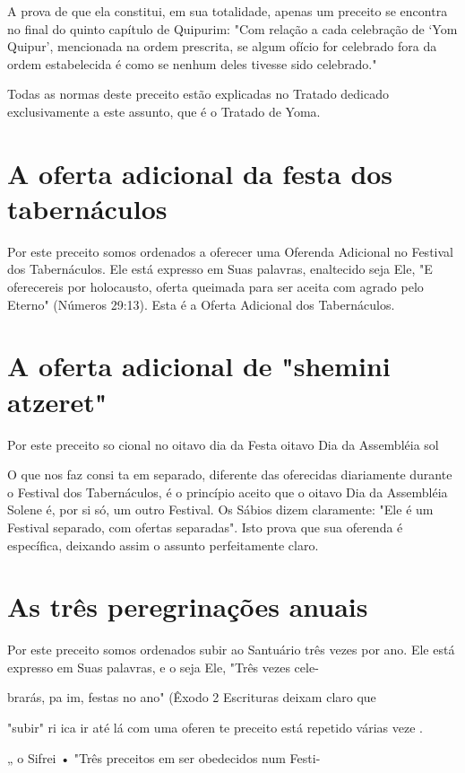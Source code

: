 \begin{itemize}
\begin{enumrate}
\begin{itemize}
\begin{itemize}
A prova de que ela constitui, em sua totalidade, apenas um preceito se
encontra no final do quinto capítulo de Quipurim: "Com relação a cada
ce­lebração de `Yom Quipur', mencionada na ordem prescrita, se algum
ofício for celebrado fora da ordem estabelecida é como se nenhum deles
tivesse sido ce­lebrado."

Todas as normas deste preceito estão explicadas no Tratado dedica­do
exclusivamente a este assunto, que é o Tratado de Yoma.

\section{A oferta adicional da festa dos tabernáculos}

Por este preceito somos ordenados a oferecer uma Oferenda Adi­cional no
Festival dos Tabernáculos. Ele está expresso em Suas palavras,
enal­tecido seja Ele, "E oferecereis por holocausto, oferta queimada
para ser aceita com agrado pelo Eterno" (Números 29:13). Esta é a Oferta
Adicional dos Ta­bernáculos.

\section{A oferta adicional de "shemini atzeret"}

Por este preceito so cional no oitavo dia da Festa oitavo Dia da
Assembléia sol

O que nos faz consi ta em separado, diferente das oferecidas diariamente
durante o Festival dos Ta­bernáculos, é o princípio aceito que o oitavo
Dia da Assembléia Solene é, por si só, um outro Festival. Os Sábios
dizem claramente: "Ele é um Festival separa­do, com ofertas separadas".
Isto prova que sua oferenda é específica, deixando assim o assunto
perfeitamente claro.

\section{As três peregrinações anuais}

Por este preceito somos ordenados subir ao Santuário três vezes por ano.
Ele está expresso em Suas palavras, e o seja Ele, "Três vezes cele-

brarás, pa im, festas no ano" (Êxodo 2 Escrituras deixam claro que

"subir" ri ica ir até lá com uma oferen te preceito está repetido várias
veze .

„ o Sifrei • "Três preceitos em ser obedecidos num Festi-


\end{itemize}
\end{itemize}
\end{enumrate}
\end{itemize}
